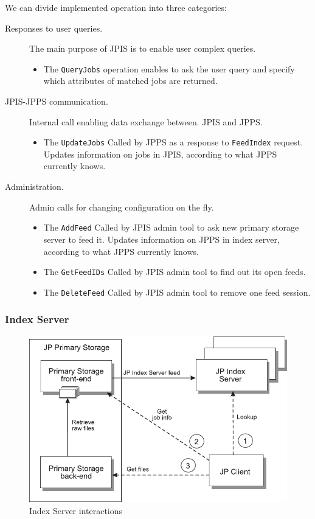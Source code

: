 We can divide implemented operation into three categories:
\begin{description}
\item[Responses to user queries.] 
The main purpose of JPIS is to enable user complex queries.

\begin{itemize}
\item The \texttt{QueryJobs} operation enables to ask the user query and
specify which attributes of matched jobs are returned.
\end{itemize}

\item[JPIS-JPPS communication.] Internal call enabling data exchange between.
JPIS and JPPS.
\begin{itemize}
\item The \texttt{UpdateJobs} Called by JPPS as a response to \texttt{FeedIndex}
request. Updates information on jobs in JPIS, according to what JPPS
currently knows.
\end{itemize}

\item[Administration.] Admin calls for changing configuration on the fly.
\begin{itemize}
\item The \texttt{AddFeed} Called by JPIS admin tool to ask new  primary storage server to feed it. Updates information on JPPS in index server, according to what JPPS currently knows.
\item The \texttt{GetFeedIDs} Called by JPIS admin tool to find out its open feeds. 
\item The \texttt{DeleteFeed} Called by JPIS admin tool to remove one feed session.
\end{itemize} 

\end{description}


\subsubsection{Index Server} 
\label{index}
\begin{figure}
  \centering
  \includegraphics[scale=0.5]{images/JP-query}
  \caption{Index Server interactions}
  \label{fig:query}
\end{figure}




